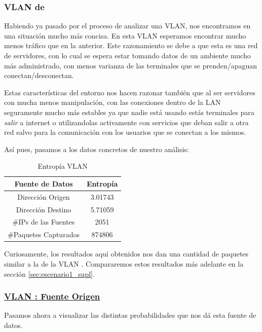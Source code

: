 \subsubsection{VLAN de~}
\par Habiendo ya pasado por el proceso de analizar una VLAN, nos encontramos en una
situaci\'on mucho m\'as concisa. En esta VLAN esperamos encontrar mucho menos tr\'afico
que en la anterior. Este razonamiento se debe a que esta es una red de servidores, con
lo cual se espera estar tomando datos de un ambiente mucho m\'as administrado, con
menos varianza de las terminales que se prenden/apaguan conectan/desconectan.

\par Estas caracter\'isticas del entorno nos hacen razonar tambi\'en que al ser
servidores con mucha menos manipulaci\'on, con las conexiones dentro de la LAN
seguramente mucho m\'as estables ya que nadie est\'a usando est\'as terminales
para \textit{salir} a internet o utilizandolas activamente con servicios que
deban salir a otra red salvo para la comunicaci\'on con los usuarios que se conectan
a los mismos.

\par As\'i pues, pasamos a los datos concretos de nuestro an\'alisis:

\begin{table}[!h]
\centering
  \begin{tabular}{c c}
    Fuente de Datos & Entrop\'ia \\
    \hline\hline
    Direcci\'on Origen & 3.01743 \\
    Direcci\'on Destino & 5.71059 \\
    \hline\hline
    \#IPs de las Fuentes & 2051\\
    \#Paquetes Capturados & 874806\\
    \hline
    \end{tabular}
  \bigskip
  \caption{Entrop\'ia VLAN }
  \label{tab:vlan20_entropia}
\end{table}

\par Curiosamente, los resultados aqu\'i obtenidos nos dan una cantidad de paquetes
similar a la de la VLAN . Compararemos estos resultados m\'as
adelante en la secci\'on \ref{sec:escenario1_supl}.


\subsubsection*{\underline{VLAN : Fuente Origen}}\label{subsubsec:vlan20_src}
\par Pasamos ahora a visualizar las distintas probabilidades que nos d\'a esta fuente de
datos.


